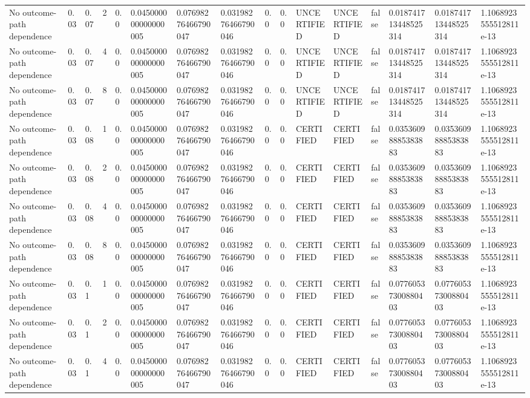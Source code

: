 \begin{tabular}{llllllllllllllll}
No outcome-path dependence & 0.03 & 0.07 & 2 & 0.0 & 0.045000000000000005 & 0.07698276466790047 & 0.03198276466790046 & 0.0 & 0.0 & UNCERTIFIED & UNCERTIFIED & false & 0.018741713448525314 & 0.018741713448525314 & 1.1068923555512811e-13 \\
No outcome-path dependence & 0.03 & 0.07 & 4 & 0.0 & 0.045000000000000005 & 0.07698276466790047 & 0.03198276466790046 & 0.0 & 0.0 & UNCERTIFIED & UNCERTIFIED & false & 0.018741713448525314 & 0.018741713448525314 & 1.1068923555512811e-13 \\
No outcome-path dependence & 0.03 & 0.07 & 8 & 0.0 & 0.045000000000000005 & 0.07698276466790047 & 0.03198276466790046 & 0.0 & 0.0 & UNCERTIFIED & UNCERTIFIED & false & 0.018741713448525314 & 0.018741713448525314 & 1.1068923555512811e-13 \\
No outcome-path dependence & 0.03 & 0.08 & 1 & 0.0 & 0.045000000000000005 & 0.07698276466790047 & 0.03198276466790046 & 0.0 & 0.0 & CERTIFIED & CERTIFIED & false & 0.03536098885383883 & 0.03536098885383883 & 1.1068923555512811e-13 \\
No outcome-path dependence & 0.03 & 0.08 & 2 & 0.0 & 0.045000000000000005 & 0.07698276466790047 & 0.03198276466790046 & 0.0 & 0.0 & CERTIFIED & CERTIFIED & false & 0.03536098885383883 & 0.03536098885383883 & 1.1068923555512811e-13 \\
No outcome-path dependence & 0.03 & 0.08 & 4 & 0.0 & 0.045000000000000005 & 0.07698276466790047 & 0.03198276466790046 & 0.0 & 0.0 & CERTIFIED & CERTIFIED & false & 0.03536098885383883 & 0.03536098885383883 & 1.1068923555512811e-13 \\
No outcome-path dependence & 0.03 & 0.08 & 8 & 0.0 & 0.045000000000000005 & 0.07698276466790047 & 0.03198276466790046 & 0.0 & 0.0 & CERTIFIED & CERTIFIED & false & 0.03536098885383883 & 0.03536098885383883 & 1.1068923555512811e-13 \\
No outcome-path dependence & 0.03 & 0.1 & 1 & 0.0 & 0.045000000000000005 & 0.07698276466790047 & 0.03198276466790046 & 0.0 & 0.0 & CERTIFIED & CERTIFIED & false & 0.07760537300880403 & 0.07760537300880403 & 1.1068923555512811e-13 \\
No outcome-path dependence & 0.03 & 0.1 & 2 & 0.0 & 0.045000000000000005 & 0.07698276466790047 & 0.03198276466790046 & 0.0 & 0.0 & CERTIFIED & CERTIFIED & false & 0.07760537300880403 & 0.07760537300880403 & 1.1068923555512811e-13 \\
No outcome-path dependence & 0.03 & 0.1 & 4 & 0.0 & 0.045000000000000005 & 0.07698276466790047 & 0.03198276466790046 & 0.0 & 0.0 & CERTIFIED & CERTIFIED & false & 0.07760537300880403 & 0.07760537300880403 & 1.1068923555512811e-13 \\

\end{tabular}

